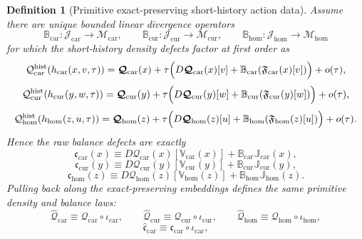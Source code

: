 \documentclass[11pt]{article}
\newcommand{\TensorStateEmbed}{\iota_{\mathrm{car}}}
\newcommand{\CurStateEmbed}{\iota_{\mathrm{cur}}}
\newcommand{\HomStateEmbed}{\iota_{\mathrm{hom}}}
\newcommand{\TensorRawDensity}{\boldsymbol{\mathcal Q}_{\mathrm{car}}}
\newcommand{\CurRawDensity}{\boldsymbol{\mathcal Q}_{\mathrm{cur}}}
\newcommand{\HomRawDensity}{\boldsymbol{\mathcal Q}_{\mathrm{hom}}}
\newcommand{\TensorTransport}{\mathbb V_{\mathrm{car}}}
\newcommand{\CurTransport}{\mathbb V_{\mathrm{cur}}}
\newcommand{\HomTransport}{\mathbb V_{\mathrm{hom}}}
\newcommand{\TensorFluxClass}{\mathscr J_{\mathrm{car}}}
\newcommand{\CurFluxClass}{\mathscr J_{\mathrm{cur}}}
\newcommand{\HomFluxClass}{\mathscr J_{\mathrm{hom}}}
\newcommand{\TensorFlux}{\mathbb J_{\mathrm{car}}}
\newcommand{\CurFlux}{\mathbb J_{\mathrm{cur}}}
\newcommand{\HomFlux}{\mathbb J_{\mathrm{hom}}}
\newcommand{\TensorDiv}{\mathbb B_{\mathrm{car}}}
\newcommand{\CurDiv}{\mathbb B_{\mathrm{cur}}}
\newcommand{\HomDiv}{\mathbb B_{\mathrm{hom}}}
\newcommand{\TensorRawBalance}{\boldsymbol{\mathfrak c}_{\mathrm{car}}}
\newcommand{\CurRawBalance}{\boldsymbol{\mathfrak c}_{\mathrm{cur}}}
\newcommand{\HomRawBalance}{\boldsymbol{\mathfrak c}_{\mathrm{hom}}}
\newcommand{\TensorPrimitiveDensity}{\widehat{\mathcal Q}_{\mathrm{car}}}
\newcommand{\CurPrimitiveDensity}{\widehat{\mathcal Q}_{\mathrm{cur}}}
\newcommand{\HomPrimitiveDensity}{\widehat{\mathcal Q}_{\mathrm{hom}}}
\newcommand{\TensorBalance}{\widehat{\mathfrak c}_{\mathrm{car}}}
\newcommand{\TensorFluxRead}{\mathfrak F_{\mathrm{car}}}
\newcommand{\CurFluxRead}{\mathfrak F_{\mathrm{cur}}}
\newcommand{\HomFluxRead}{\mathfrak F_{\mathrm{hom}}}
\newtheorem{definition}{Definition}
\begin{document}
\begin{definition}[Primitive exact-preserving short-history action data]
Assume there are unique bounded linear divergence operators
\[
\TensorDiv:\TensorFluxClass\to\mathscr M_{\mathrm{car}},\qquad
\CurDiv:\CurFluxClass\to\mathscr M_{\mathrm{cur}},\qquad
\HomDiv:\HomFluxClass\to\mathscr M_{\mathrm{hom}}
\]
for which the short-history density defects factor at first order as
\begin{equation}
\mathcal Q_{\mathrm{car}}^{\mathrm{hist}}(h_{\mathrm{car}}(x,v,\tau))
=
\TensorRawDensity(x)
+\tau\Bigl(
D\TensorRawDensity(x)[v]
+\TensorDiv(\TensorFluxRead(x)[v])
\Bigr)
+o(\tau),
\label{eq:history_density_defect_car}
\end{equation}
\begin{equation}
\mathcal Q_{\mathrm{cur}}^{\mathrm{hist}}(h_{\mathrm{cur}}(y,w,\tau))
=
\CurRawDensity(y)
+\tau\Bigl(
D\CurRawDensity(y)[w]
+\CurDiv(\CurFluxRead(y)[w])
\Bigr)
+o(\tau),
\label{eq:history_density_defect_cur}
\end{equation}
\begin{equation}
\mathcal Q_{\mathrm{hom}}^{\mathrm{hist}}(h_{\mathrm{hom}}(z,u,\tau))
=
\HomRawDensity(z)
+\tau\Bigl(
D\HomRawDensity(z)[u]
+\HomDiv(\HomFluxRead(z)[u])
\Bigr)
+o(\tau).
\label{eq:history_density_defect_hom}
\end{equation}
Hence the raw balance defects are exactly
\begin{equation}
\TensorRawBalance(x)
\equiv
D\TensorRawDensity(x)[\TensorTransport(x)]
+\TensorDiv\TensorFlux(x),
\label{eq:history_raw_balance_car}
\end{equation}
\begin{equation}
\CurRawBalance(y)
\equiv
D\CurRawDensity(y)[\CurTransport(y)]
+\CurDiv\CurFlux(y),
\label{eq:history_raw_balance_cur}
\end{equation}
\begin{equation}
\HomRawBalance(z)
\equiv
D\HomRawDensity(z)[\HomTransport(z)]
+\HomDiv\HomFlux(z).
\label{eq:history_raw_balance_hom}
\end{equation}
Pulling back along the exact-preserving embeddings defines the same primitive density and balance laws:
\begin{equation}
\TensorPrimitiveDensity\equiv\TensorRawDensity\circ\TensorStateEmbed,\qquad
\CurPrimitiveDensity\equiv\CurRawDensity\circ\CurStateEmbed,\qquad
\HomPrimitiveDensity\equiv\HomRawDensity\circ\HomStateEmbed,
\label{eq:history_primitive_density}
\end{equation}
\begin{equation}
\TensorBalance\equiv\TensorRawBalance\circ\TensorStateEmbed,\qquad

\end{equation}
\end{definition}
\end{document}
